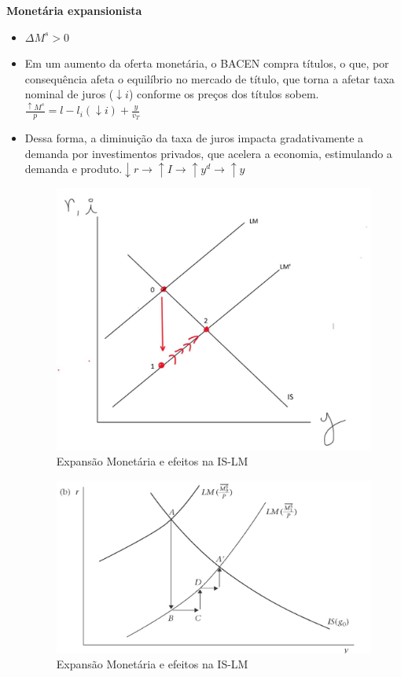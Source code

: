 \documentclass[a4paper,12pt]{article}[abntex2]
\begin{document}
\textbf{Monetária expansionista }\begin{itemize}
    \item $\Delta M^s>0$
    \item Em um aumento da oferta monetária, o BACEN compra títulos, o que, por consequência afeta o equilíbrio no mercado de título, que torna a afetar taxa nominal de juros ($\downarrow i$) conforme os preços dos títulos sobem. $\frac{\uparrow M^s}{p}=l-l_i(\downarrow i)+\frac{y}{v_T}$
    \item  Dessa  forma,  a  diminuição  da  taxa  de  juros  impacta  gradativamente  a  demanda  por investimentos privados, que acelera a economia, estimulando a demanda e produto.$\downarrow r\rightarrow \uparrow I\rightarrow\uparrow y^d\rightarrow\uparrow y$
    \begin{figure}[H]
        \centering
        \caption{Expansão Monetária e efeitos na IS-LM}
        \includegraphics[width=0.7\linewidth]{Imagens/a4i4.png}
    \end{figure}
    \begin{figure}[H]
        \centering
        \caption{Expansão Monetária e efeitos na IS-LM}
        \includegraphics[width=0.7\linewidth]{Imagens/a4i8.png}
    \end{figure}
\end{itemize}
\end{document}
